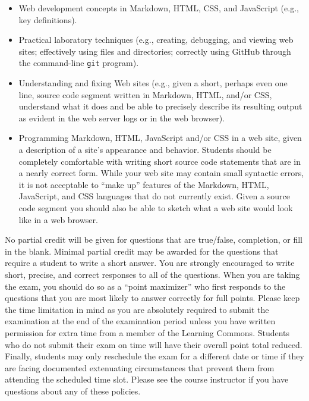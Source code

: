 \documentclass[11pt]{article}
\begin{document}
\vspace*{-.05in}
\begin{itemize}

  \itemsep 0in

  \item Web development concepts in Markdown, HTML, CSS, and JavaScript (e.g.,
    key definitions).

  \item Practical laboratory techniques (e.g., creating, debugging, and viewing
    web sites; effectively using files and directories; correctly using GitHub
    through the command-line {\tt git} program).

  \item Understanding and fixing Web sites (e.g., given a short, perhaps even
    one line, source code segment written in Markdown, HTML, and/or CSS,
    understand what it does and be able to precisely describe its resulting
    output as evident in the web server logs or in the web browser).

  \item Programming Markdown, HTML, JavaScript and/or CSS in a web site, given a
    description of a site's appearance and behavior. Students should be
    completely comfortable with writing short source code statements that are in
    a nearly correct form. While your web site may contain small syntactic
    errors, it is not acceptable to ``make up'' features of the Markdown, HTML,
    JavaScript, and CSS languages that do not currently exist. Given a source
    code segment you should also be able to sketch what a web site would look
    like in a web browser.

\end{itemize}

\noindent No partial credit will be given for questions that are true/false,
completion, or fill in the blank. Minimal partial credit may be awarded for the
questions that require a student to write a short answer. You are strongly
encouraged to write short, precise, and correct responses to all of the
questions. When you are taking the exam, you should do so as a ``point
maximizer'' who first responds to the questions that you are most likely to
answer correctly for full points. Please keep the time limitation in mind as you
are absolutely required to submit the examination at the end of the examination
period unless you have written permission for extra time from a member of the
Learning Commons. Students who do not submit their exam on time will have their
overall point total reduced. Finally, students may only reschedule the exam for
a different date or time if they are facing documented extenuating circumstances
that prevent them from attending the scheduled time slot. Please see the course
instructor if you have questions about any of these policies.
\end{document}
